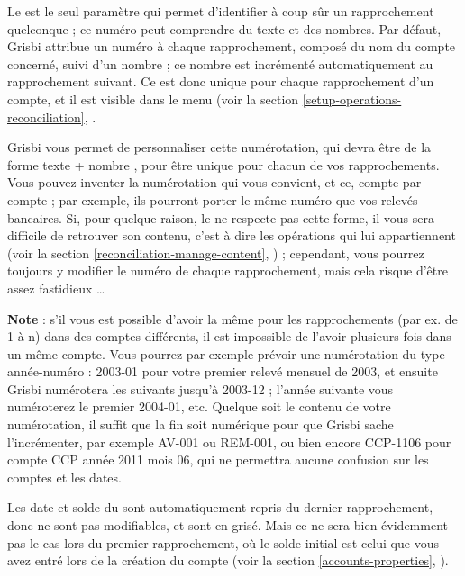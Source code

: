 Le  est le seul paramètre qui permet d'identifier à coup sûr un rapprochement quelconque ; ce numéro peut comprendre du texte et des nombres. Par défaut, Grisbi attribue un numéro à chaque rapprochement, composé du nom du compte concerné, suivi d'un nombre ; ce nombre est incrémenté automatiquement au rapprochement suivant. Ce  est donc unique pour chaque rapprochement d'un compte, et il est visible dans le menu  (voir la section \vref{setup-operations-reconciliation}, . 

Grisbi vous permet de personnaliser cette numérotation, qui devra être de la forme \og texte + nombre \fg{}, pour être unique pour chacun de vos rapprochements. Vous pouvez inventer la numérotation qui vous convient, et ce, compte par compte ; par exemple, ils pourront porter le même numéro que vos relevés bancaires. Si, pour quelque raison, le  ne respecte pas cette forme, il vous sera difficile de retrouver son contenu, c'est à dire les opérations qui lui appartiennent (voir la section \vref{reconciliation-manage-content}, ) ; cependant, vous pourrez toujours y modifier le numéro de chaque rapprochement, mais cela risque d'être assez fastidieux \ldots

\textbf{Note} : s'il vous est possible d'avoir la même  pour les rapprochements (par ex. de 1 à n) dans des comptes différents, il est impossible de l'avoir plusieurs fois dans un même compte. Vous pourrez par exemple prévoir une numérotation du type année-numéro : 2003-01 pour votre premier relevé mensuel de 2003, et ensuite Grisbi numérotera les suivants jusqu'à 2003-12 ; l'année suivante vous numéroterez le premier 2004-01, etc. Quelque soit le contenu de votre numérotation, il suffit que la fin soit numérique pour que Grisbi sache l'incrémenter, par exemple AV-001 ou REM-001, ou bien encore CCP-1106 pour compte CCP année 2011 mois 06, qui ne permettra aucune confusion sur les comptes et les dates. 

Les date et solde du  sont automatiquement repris du dernier rapprochement, donc ne sont pas modifiables, et sont en grisé. Mais ce ne sera bien évidemment pas le cas lors du premier rapprochement, où le solde initial est celui que vous avez entré lors de la création du compte (voir la section \vref{accounts-properties}, ).

